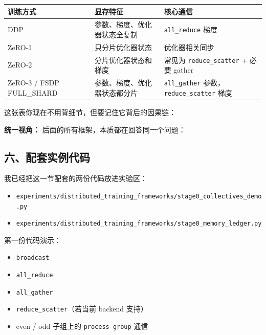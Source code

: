 \begin{center}
{\small
\begin{tabular}{p{2.7cm}p{4cm}p{5.4cm}}
\hline
\textbf{训练方式} & \textbf{显存特征} & \textbf{核心通信} \\
\hline
DDP & 参数、梯度、优化器状态全复制 & \texttt{all\_reduce} 梯度 \\
ZeRO-1 & 只分片优化器状态 & 优化器相关同步 \\
ZeRO-2 & 分片优化器状态和梯度 & 常见为 \texttt{reduce\_scatter} + 必要 gather \\
ZeRO-3 / FSDP FULL\_SHARD & 参数、梯度、优化器状态都分片 & \texttt{all\_gather} 参数，\texttt{reduce\_scatter} 梯度 \\
\hline
\end{tabular}
}
\end{center}

这张表你现在不用背细节，但要记住它背后的因果链：

\begin{summarybox}
\textbf{统一视角：} 后面的所有框架，本质都在回答同一个问题：\\
\end{summarybox}

\subsection{六、配套实例代码}

我已经把这一节配套的两份代码放进实验区：

\begin{itemize}[leftmargin=1.5em]
  \item \texttt{experiments/distributed\_training\_frameworks/stage0\_collectives\_demo.py}
  \item \texttt{experiments/distributed\_training\_frameworks/stage0\_memory\_ledger.py}
\end{itemize}

第一份代码演示：
\begin{itemize}[leftmargin=1.5em]
  \item \texttt{broadcast}
  \item \texttt{all\_reduce}
  \item \texttt{all\_gather}
  \item \texttt{reduce\_scatter}（若当前 backend 支持）
  \item even / odd 子组上的 \texttt{process group} 通信
\end{itemize}


